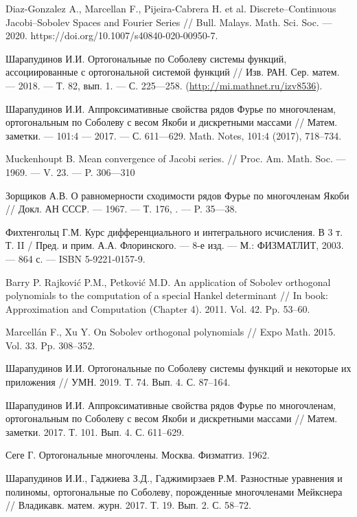 \begin{thebibliography}{111}
Diaz-Gonzalez A., Marcellan F., Pijeira-Cabrera H. et al.
Discrete--Continuous Jacobi--Sobolev Spaces and Fourier Series
//
Bull. Malays. Math. Sci. Soc.
--- 2020. https://doi.org/10.1007/s40840-020-00950-7.

Шарапудинов И.И.
Ортогональные по Соболеву системы функций, ассоциированные с ортогональной системой функций
//
Изв. РАН. Сер. матем.
--- 2018.
--- Т. 82, вып. 1.
--- С. 225---258. (\url{http://mi.mathnet.ru/izv8536}).

Шарапудинов И.И.
Аппроксимативные свойства рядов Фурье по многочленам, ортогональным по Соболеву с весом Якоби и дискретными массами
//
Матем. заметки.
--- 101:4
--- 2017.
--- С. 611---629.
Math. Notes, 101:4 (2017), 718–734.

Muckenhoupt B.
Mean convergence of Jacobi series.
//
Proc. Am. Math. Soc.
--- 1969.
--- V. 23.
--- P. 306---310

Зорщиков А.В.
О равномерности сходимости рядов Фурье по многочленам Якоби
//
Докл. АН СССР.
--- 1967.
--- Т. 176, .
--- P. 35---38.

Фихтенгольц Г.М.
Курс дифференциального и интегрального исчисления. В 3 т. Т. II / Пред. и прим. А.А. Флоринского. 
--- 8-е изд. 
--- М.: ФИЗМАТЛИТ, 2003. 
--- 864 с. 
--- ISBN 5-9221-0157-9.


{Barry P. Rajkovi\'c P.M., Petkovi\'c M.D.} An application of Sobolev orthogonal polynomials to the computation of a special Hankel determinant // In book: Approximation and Computation (Chapter 4). 2011. Vol. 42. Pp. 53--60.

{Marcell\'an F., Xu Y.} On Sobolev orthogonal polynomials // Expo Math. 2015. Vol. 33. Pp. 308--352.

{Шарапудинов И.И.} Ортогональные по Соболеву системы функций и некоторые их приложения // УМН. 2019. Т. 74. Вып. 4. С. 87--164.

{Шарапудинов И.И.} Аппроксимативные свойства рядов Фурье по многочленам, ортогональным по Соболеву с весом Якоби и дискретными массами // Матем. заметки. 2017. Т. 101. Вып. 4. С. 611--629.	

{Сеге Г.} Ортогональные многочлены. Москва. Физматгиз. 1962.	

{Шарапудинов И.И., Гаджиева З.Д., Гаджимирзаев Р.М.} Разностные уравнения и полиномы, ортогональные по Соболеву, порожденные многочленами Мейкснера //  Владикавк. матем. журн. 2017. Т. 19. Вып. 2. С. 58--72.


\end{thebibliography}
